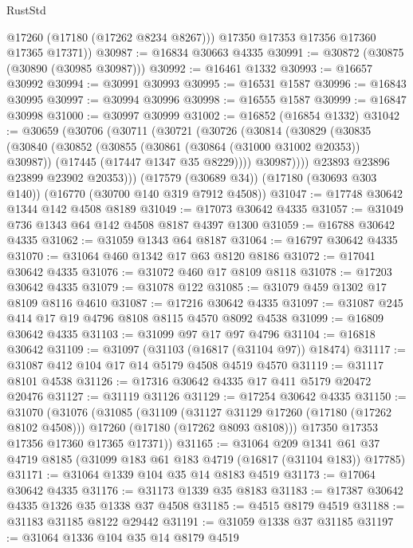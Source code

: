 \begin{lexlean}{RustStd}
\begin{coremodule}
{\begin{coremodule}
{{{{{{{{{{{{{{{{{{{{{{{{{{{{{{{{{{{{{{{{{{{{{{{{{{{{{{{          @17260
          (@17180 (@17262 @8234 @8267)))
        @17350
        @17353
        @17356
        @17360
        @17365
        @17371))
@30987 := @16834 @30663 @4335
@30991 := @30872 (@30875 (@30890 (@30985 @30987)))
@30992 := @16461 @1332
@30993 := @16657 @30992
@30994 := @30991 @30993
@30995 := @16531 @1587
@30996 := @16843 @30995
@30997 := @30994 @30996
@30998 := @16555 @1587
@30999 := @16847 @30998
@31000 := @30997 @30999
@31002 := @16852 (@16854 @1332)
@31042 := @30659
    (@30706
      (@30711
        (@30721
          (@30726
            (@30814
              (@30829
                (@30835
                  (@30840
                    (@30852
                      (@30855 (@30861 (@30864 (@31000 @31002 @20353)) @30987))
                      (@17445 (@17447 @1347 @35 @8229))))
                  @30987))))
          @23893
          @23896
          @23899
          @23902
          @20353)))
    (@17579 (@30689 @34))
    (@17180 (@30693 @303 @140))
    (@16770 (@30700 @140 @319 @7912 @4508))
@31047 := @17748 @30642 @1344 @142 @4508 @8189
@31049 := @17073 @30642 @4335
@31057 := @31049 @736 @1343 @64 @142 @4508 @8187 @4397 @1300
@31059 := @16788 @30642 @4335
@31062 := @31059 @1343 @64 @8187
@31064 := @16797 @30642 @4335
@31070 := @31064 @460 @1342 @17 @63 @8120 @8186
@31072 := @17041 @30642 @4335
@31076 := @31072 @460 @17 @8109 @8118
@31078 := @17203 @30642 @4335
@31079 := @31078 @122
@31085 := @31079 @459 @1302 @17 @8109 @8116 @4610
@31087 := @17216 @30642 @4335
@31097 := @31087 @245 @414 @17 @19 @4796 @8108 @8115 @4570 @8092 @4538
@31099 := @16809 @30642 @4335
@31103 := @31099 @97 @17 @97 @4796
@31104 := @16818 @30642
@31109 := @31097 (@31103 (@16817 (@31104 @97)) @18474)
@31117 := @31087 @412 @104 @17 @14 @5179 @4508 @4519 @4570
@31119 := @31117 @8101 @4538
@31126 := @17316 @30642 @4335 @17 @411 @5179 @20472 @20476
@31127 := @31119 @31126
@31129 := @17254 @30642 @4335
@31150 := @31070
    (@31076
      (@31085
        (@31109
          (@31127 @31129 @17260 (@17180 (@17262 @8102 @4508)))
          @17260
          (@17180 (@17262 @8093 @8108)))
        @17350
        @17353
        @17356
        @17360
        @17365
        @17371))
@31165 := @31064
    @209
    @1341
    @61
    @37
    @4719
    @8185
    (@31099 @183 @61 @183 @4719 (@16817 (@31104 @183)) @17785)
@31171 := @31064 @1339 @104 @35 @14 @8183 @4519
@31173 := @17064 @30642 @4335
@31176 := @31173 @1339 @35 @8183
@31183 := @17387 @30642 @4335 @1326 @35 @1338 @37 @4508
@31185 := @4515 @8179 @4519
@31188 := @31183 @31185 @8122 @29442
@31191 := @31059 @1338 @37 @31185
@31197 := @31064 @1336 @104 @35 @14 @8179 @4519
}}}}}}}}}}}}}}}}}}}}}}}}}}}}}}}}}}}}}}}}}}}}}}}}}}}}}}}
\end{coremodule}}
\end{coremodule}
\end{lexlean}

